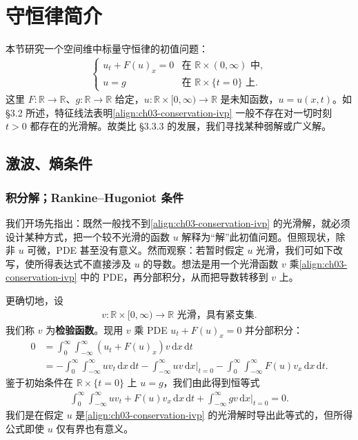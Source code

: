 \documentclass[../../main.tex]{subfiles}
\begin{document}
\section{守恒律简介}\label{section:ch03-conservation}

本节研究一个空间维中标量守恒律的初值问题：
\begin{align}\label{align:ch03-conservation-ivp}
\begin{cases}
u_t+F(u)_x=0 & \text{在 }\mathbb{R}\times(0,\infty)\text{ 中},\\
u=g & \text{在 }\mathbb{R}\times\{t=0\}\text{ 上}.
\end{cases}
\end{align}
这里 $F:\mathbb{R}\to\mathbb{R}$、$g:\mathbb{R}\to\mathbb{R}$ 给定，$u:\mathbb{R}\times[0,\infty)\to\mathbb{R}$ 是未知函数，$u=u(x,t)$。如 \S3.2 所述，特征线法表明\eqref{align:ch03-conservation-ivp} 一般不存在对一切时刻 $t>0$ 都存在的光滑解。故类比 \S3.3.3 的发展，我们寻找某种弱解或广义解。

\subsection{激波、熵条件}\label{subsection:ch03-shock}

\subsubsection{积分解；Rankine--Hugoniot 条件}

我们开场先指出：既然一般找不到\eqref{align:ch03-conservation-ivp} 的光滑解，就必须设计某种方式，把一个较不光滑的函数 $u$ 解释为``解''此初值问题。但照现状，除非 $u$ 可微，PDE 甚至没有意义。然而观察：若暂时假定 $u$ 光滑，我们可如下改写，使所得表达式不直接涉及 $u$ 的导数。想法是用一个光滑函数 $v$ 乘\eqref{align:ch03-conservation-ivp} 中的 PDE，再分部积分，从而把导数转移到 $v$ 上。

更确切地，设
\begin{align}\label{align:ch03-test-fn}
v:\mathbb{R}\times[0,\infty)\to\mathbb{R}\text{ 光滑，具有紧支集}.
\end{align}
我们称 $v$ 为\textbf{检验函数}。现用 $v$ 乘 PDE $u_t+F(u)_x=0$ 并分部积分：
\begin{align*}
0&=\int_0^\infty\int_{-\infty}^{\infty}(u_t+F(u)_x)v\,\mathrm{d}x\,\mathrm{d}t\\
&=-\int_0^\infty\int_{-\infty}^{\infty}uv_t\,\mathrm{d}x\,\mathrm{d}t-\int_{-\infty}^{\infty}uv\,\mathrm{d}x\big|_{t=0}-\int_0^\infty\int_{-\infty}^{\infty}F(u)v_x\,\mathrm{d}x\,\mathrm{d}t.
\end{align*}
鉴于初始条件在 $\mathbb{R}\times\{t=0\}$ 上 $u=g$，我们由此得到恒等式
\begin{align}\label{align:ch03-integral-sol}
\int_0^\infty\int_{-\infty}^{\infty}uv_t+F(u)v_x\,\mathrm{d}x\,\mathrm{d}t+\int_{-\infty}^{\infty}gv\,\mathrm{d}x\big|_{t=0}=0.
\end{align}
我们是在假定 $u$ 是\eqref{align:ch03-conservation-ivp} 的光滑解时导出此等式的，但所得公式即使 $u$ 仅有界也有意义。
\end{document}
